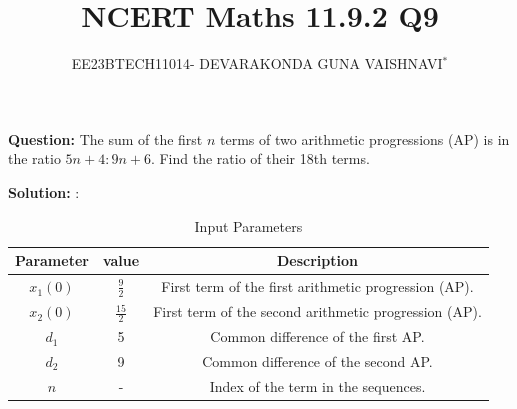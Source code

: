 \documentclass[journal,12pt,onecolumn]{IEEEtran}
\title{
	
	\title{NCERT Maths 11.9.2 Q9}
	\author{EE23BTECH11014- DEVARAKONDA GUNA VAISHNAVI$^{*}$%
	}
	
	
}
\theoremstyle{remark}
\newcommand{\solution}{\noindent \textbf{Solution: }}
\begin{document}
\maketitle
	
\textbf{Question:} 
The sum of the first $n$ terms of two arithmetic progressions (AP) is in the ratio $5n+4 : 9n+6$. Find the ratio of their 18th terms.

\solution:

\begin{table}[htbp]
	\centering
    \begin{tabular}{|c|c|c|}
    \hline
    \textbf{Parameter} &\textbf{value}& \textbf{Description} \\
    \hline
    \( x_1(0) \) & $\frac{9}{2}$& First term of the first arithmetic progression (AP). \\
    \hline
    \( x_2(0) \) &$\frac{15}{2}$& First term of the second arithmetic progression (AP).  \\
    \hline
    \( d_1 \) & 5 &Common difference of the first AP. \\
    \hline
    \( d_2 \) & 9&Common difference of the second AP. \\
    \hline
    \( n \) & - &Index of the term in the sequences. \\
    \hline
    \end{tabular}
    \label{tab:parameters}
     \caption{Input Parameters}
\end{table}
\end{document}

